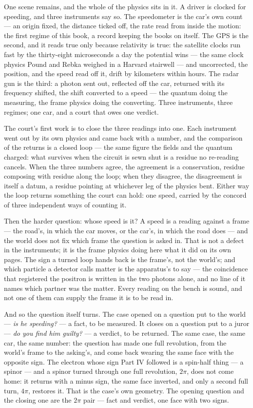 One scene remains, and the whole of the physics sits in it. A driver is clocked for speeding, and three
instruments say so. The speedometer is the car's own count --- an origin fixed, the distance ticked off, the
rate read from inside the motion: the first regime of this book, a record keeping the books on itself. The
GPS is the second, and it reads true only because relativity is true: the satellite clocks run fast by the
thirty-eight microseconds a day the potential wins --- the same clock physics Pound and Rebka weighed in a
Harvard stairwell --- and uncorrected, the position, and the speed read off it, drift by kilometers within
hours. The radar gun is the third: a photon sent out, reflected off the car, returned with its frequency
shifted, the shift converted to a speed --- the quantum doing the measuring, the frame physics doing the
converting. Three instruments, three regimes; one car, and a court that owes one verdict.

The court's first work is to close the three readings into one. Each instrument went out by its own physics
and came back with a number, and the comparison of the returns is a closed loop --- the same figure the
fields and the quantum charged: what survives when the circuit is sewn shut is a residue no re-reading
cancels. When the three numbers agree, the agreement is a conservation, residue composing with residue along
the loop; when they disagree, the disagreement is itself a datum, a residue pointing at whichever leg of the
physics bent. Either way the loop returns something the court can hold: one speed, carried by the concord of
three independent ways of counting it.

Then the harder question: whose speed is it? A speed is a reading against a frame --- the road's, in which
the car moves, or the car's, in which the road does --- and the world does not fix which frame the question
is asked in. That is not a defect in the instruments; it is the frame physics doing here what it did on its
own pages. The sign a turned loop hands back is the frame's, not the world's; and which particle a detector
calls matter is the apparatus's to say --- the coincidence that registered the positron is written in the
two photons alone, and no line of it names which partner was the matter. Every reading on
the bench is sound, and not one of them can supply the frame it is to be read in.

And so the question itself turns. The case opened on a question put to the world --- \emph{is he speeding?}
--- a fact, to be measured. It closes on a question put to a juror --- \emph{do you find him guilty?} --- a
verdict, to be returned. The same case, the same car, the same number: the question has made one full
revolution, from the world's frame to the asking's, and come back wearing the same face with the opposite
sign. The electron whose sign Part IV followed is a spin-half thing --- a spinor --- and a spinor turned
through one full revolution, $2\pi$, does not come home: it returns with a minus sign, the same face
inverted, and only a second full turn, $4\pi$, restores it. That is the case's own geometry. The opening
question and the closing one are the $2\pi$ pair --- fact and verdict, one face with two signs.

